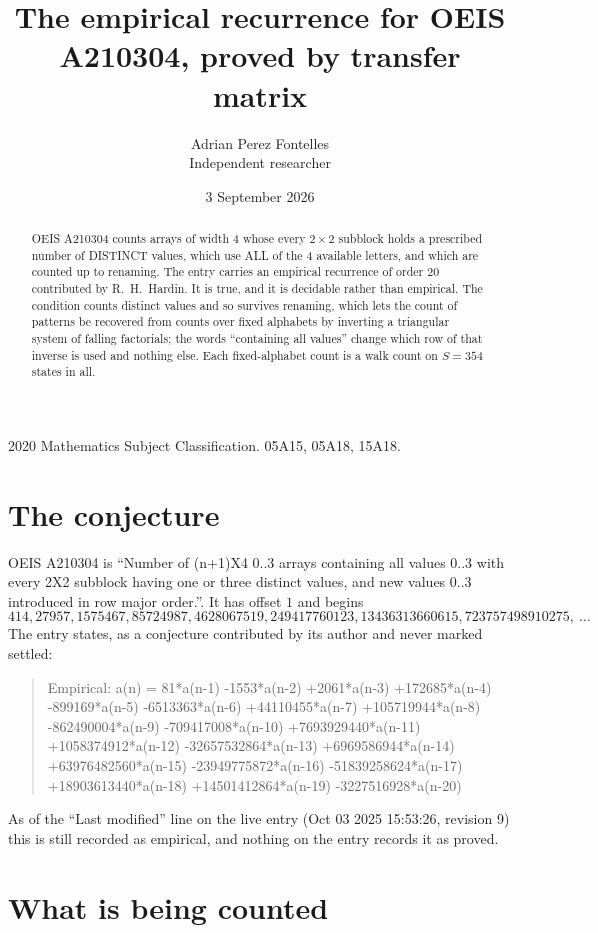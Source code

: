 \documentclass[11pt,a4paper]{article}
\title{The empirical recurrence for OEIS A210304, proved by transfer matrix}
\author{Adrian Perez Fontelles\\ \small Independent researcher}
\date{3 September 2026}
\theoremstyle{plain}
\theoremstyle{definition}
\begin{document}
\maketitle

\begin{abstract}
OEIS A210304 counts arrays of width $4$ whose every $2\times2$ subblock holds a
prescribed number of DISTINCT values, which use ALL of the $4$ available letters, and which
are counted up to renaming. The entry carries an empirical recurrence of order $20$
contributed by R.~H.~Hardin. It is true, and it is decidable rather than empirical. The
condition counts distinct values and so survives renaming, which lets the count of patterns be
recovered from counts over fixed alphabets by inverting a triangular system of falling
factorials; the words ``containing all values'' change which row of that inverse is used and
nothing else. Each fixed-alphabet count is a walk count on $S=354$ states in all.
\end{abstract}

\noindent\small 2020 Mathematics Subject Classification. 05A15, 05A18, 15A18.\normalsize

\section{The conjecture}

OEIS A210304 is ``Number of (n+1)X4 0..3 arrays containing all values 0..3 with every 2X2 subblock having one or three distinct values, and new values 0..3 introduced in row major order.''. It has offset $1$ and begins
\[
414, 27957, 1575467, 85724987, 4628067519, 249417760123, 13436313660615, 723757498910275,\ \dots
\]
The entry states, as a conjecture contributed by its author and never marked settled:
\begin{quote}
Empirical: a(n) = 81*a(n-1) -1553*a(n-2) +2061*a(n-3) +172685*a(n-4) -899169*a(n-5) -6513363*a(n-6) +44110455*a(n-7) +105719944*a(n-8) -862490004*a(n-9) -709417008*a(n-10) +7693929440*a(n-11) +1058374912*a(n-12) -32657532864*a(n-13) +6969586944*a(n-14) +63976482560*a(n-15) -23949775872*a(n-16) -51839258624*a(n-17) +18903613440*a(n-18) +14501412864*a(n-19) -3227516928*a(n-20)
\end{quote}
As of the ``Last modified'' line on the live entry (Oct 03 2025 15:53:26, revision 9) this is still
recorded as empirical, and nothing on the entry records it as proved.

\section{What is being counted}
\end{document}
